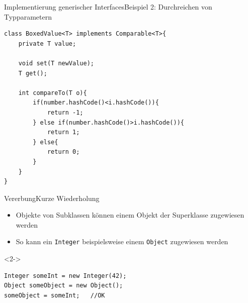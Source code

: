 \begin{frame}[fragile]{Implementierung generischer Interfaces}{Beispiel 2: Durchreichen von Typparametern}
\lstset{style=javacode}
\begin{lstlisting}
class BoxedValue<T> implements Comparable<T>{
    private T value;
    
    void set(T newValue);
    T get();
    
    int compareTo(T o){
        if(number.hashCode()<i.hashCode()){
            return -1;
        } else if(number.hashCode()>i.hashCode()){
            return 1;
        } else{
            return 0;
        }
    }
}
\end{lstlisting}
\end{frame}


\begin{frame}[fragile]{Vererbung}{Kurze Wiederholung}
\begin{minipage}{0.6\textwidth}
    \begin{itemize}
        \item Objekte von Subklassen können einem Objekt der Superklasse zugewiesen werden 
        \item So kann ein \texttt{Integer} beispielsweise einem \texttt{Object} zugewiesen werden
    \end{itemize}
    \lstset{style=javacode}
    \begin{onlyenv}<2->
    \begin{lstlisting}
Integer someInt = new Integer(42);
Object someObject = new Object();
someObject = someInt;   //OK
    \end{lstlisting}
    \end{onlyenv}
\end{minipage}%
\begin{minipage}{0.35\textwidth}
\centering
    \begin{figure}
        \centering
    \end{figure}
\end{minipage}
\end{frame}


